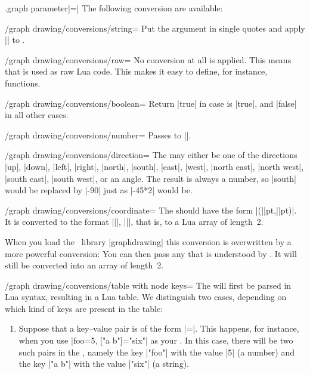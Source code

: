 \begin{handler}{{.graph parameter}|=|}
  The following conversion are available:
  \begin{key}{/graph drawing/conversions/string=}
    Put the argument in single quotes and apply |\luaescapestring| to .
  \end{key}
  \begin{key}{/graph drawing/conversions/raw=}
    No conversion at all is applied. This means that  is
    used as raw Lua code. This makes it easy to define, for instance,
    functions.
  \end{key}
  \begin{key}{/graph drawing/conversions/boolean=}
    Return |true| in case  is |true|, and |false| in all
    other cases.
  \end{key}
  \begin{key}{/graph drawing/conversions/number=}
    Passes  to |\pgfmathparse|.    
  \end{key}
  \begin{key}{/graph drawing/conversions/direction=}
    The  may either be one of the directions |up|,
    |down|, |left|, |right|, |north|, |south|, |east|, |west|,
    |north east|, |north west|, |south east|, |south west|, or an
    angle. The result is always a number, so |south| would be replaced
    by |-90| just as |-45*2| would be.
  \end{key}
  \begin{key}{/graph drawing/conversions/coordinate=}
    The  should have the form
    |(||pt,||pt)|. It is converted to the
    format |{||, ||}|, that is, to a Lua
    array of length~2.

    When you load the \tikzname\ library |graphdrawing| this
    conversion is overwritten by a more powerful conversion: You can
    then pass any  that is understood by
    \tikzname. It will still be converted into an
    array of length~2.
  \end{key}
  \begin{key}{/graph drawing/conversions/table with node keys=}
    The  will first be parsed in Lua syntax, resulting in
    a Lua table. We distinguish two cases, depending on which kind of
    keys are present in the table:

    \begin{enumerate}
    \item Suppose that a key--value pair is of the form
      |=|. This happens, for instance,
      when you use |{foo=5, ["a b"]="six"}| as your . In this
      case, there will be two such pairs in the , namely
      the key |"foo"| with the value |5| (a number) and the key
      |"a b"| with the value |"six"| (a string).


\end{enumerate}
\end{key}
\end{handler}
